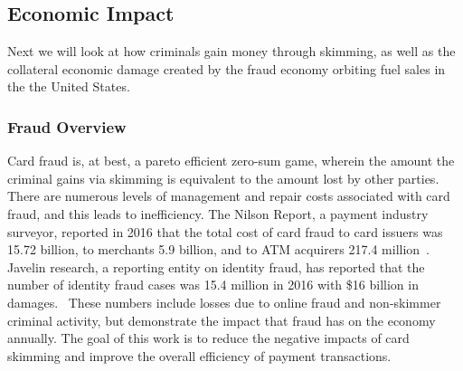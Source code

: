 %
%

\subsection{Economic Impact}

Next we will look at how criminals gain money through skimming, as well as the collateral economic damage created
by the fraud economy orbiting fuel sales in the the United States.

\subsubsection{Fraud Overview}

Card fraud is, at best, a pareto efficient zero-sum game, wherein the amount the criminal gains via skimming is
equivalent to the amount lost by other parties.
%
There are numerous levels of management and repair costs associated with card fraud, and this leads to inefficiency.
%
The Nilson Report, a payment industry surveyor, reported in 2016 that the total cost of card fraud to card issuers
was 15.72 billion, to merchants 5.9 billion, and to ATM acquirers 217.4 million~\cite{nilsonreport2016}.
%
Javelin research, a reporting entity on identity fraud, has reported that the number of identity fraud cases was 15.4
million in 2016 with \$16 billion in damages.~\cite{javelinstudy}
%
These numbers include losses due to online fraud and non-skimmer criminal activity, but demonstrate the impact that
fraud has on the economy annually.
%
The goal of this work is to reduce the negative impacts of card skimming and improve the overall efficiency of payment
transactions.


